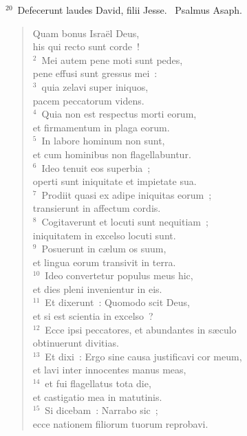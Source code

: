 ${}^{20}$~Defecerunt laudes David, filii Jesse.
~\lettrine[lines=10,image=true,loversize=0.05,lraise=-0.03]{P}{}salmus Asaph. \begin{flushleft}\begin{verse}\vspace{6pt}Quam bonus Isra\"el Deus,\\ his qui recto sunt corde~!\\
${}^{2}$~Mei autem pene moti sunt pedes,\\ pene effusi sunt gressus mei~:\\
${}^{3}$~quia zelavi super iniquos,\\ pacem peccatorum videns.\\
${}^{4}$~Quia non est respectus morti eorum,\\ et firmamentum in plaga eorum.\\
${}^{5}$~In labore hominum non sunt,\\ et cum hominibus non flagellabuntur.\\
${}^{6}$~Ideo tenuit eos superbia~;\\ operti sunt iniquitate et impietate sua.\\
${}^{7}$~Prodiit quasi ex adipe iniquitas eorum~;\\ transierunt in affectum cordis.\\
${}^{8}$~Cogitaverunt et locuti sunt nequitiam~;\\ iniquitatem in excelso locuti sunt.\\
${}^{9}$~Posuerunt in c\ae lum os suum,\\ et lingua eorum transivit in terra.\\
${}^{10}$~Ideo convertetur populus meus hic,\\ et dies pleni invenientur in eis.\\
${}^{11}$~Et dixerunt~: Quomodo scit Deus,\\ et si est scientia in excelso~?\\
${}^{12}$~Ecce ipsi peccatores, et abundantes in s\ae culo\\ obtinuerunt divitias.\\
${}^{13}$~Et dixi~: Ergo sine causa justificavi cor meum,\\ et lavi inter innocentes manus meas,\\
${}^{14}$~et fui flagellatus tota die,\\ et castigatio mea in matutinis.\\
${}^{15}$~Si dicebam~: Narrabo sic~;\\ ecce nationem filiorum tuorum reprobavi.\\

\end{verse}
\end{flushleft}
